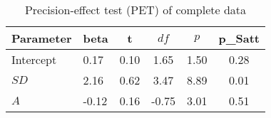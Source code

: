 \begin{table}[ht]
\centering
\caption{Precision-effect test (PET) of complete data} 
\label{tab:PET}
\begingroup\small
\begin{tabular}{llcccc}
  \hline
Parameter & beta & t & $df$ & $p$ & p_Satt \\ 
  \hline
Intercept & 0.17 & 0.10 & 1.65 & 1.50 & 0.28 \\ 
  $SD$ & 2.16 & 0.62 & 3.47 & 8.89 & 0.01 \\ 
  $A$ & -0.12 & 0.16 & -0.75 & 3.01 & 0.51 \\ 
   \hline
\end{tabular}
\endgroup
\end{table}
